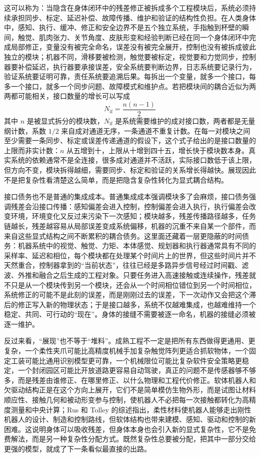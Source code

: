 这可以称为：当隐含在身体闭环中的残差修正被拆成多个工程模块后，系统必须持续承担同步、标定、延迟补偿、故障传播、维护和验证的结构性负担。在人类身体中，感知、执行、缓冲、修正和安全边界不是五个独立系统，手指触到杯壁的瞬间，触觉、肌肉张力、关节角度、皮肤形变和经验判断已经在同一个身体闭环中完成局部修正，变量没有被完全命名，误差没有被完全展开，控制也没有被拆成彼此独立的模块；机器不同，滑移要被检测，触觉要被标定，视觉要和力觉同步，控制器要补偿延迟，执行器要承接误差，安全系统要判断边界，日志系统要记录行为，验证系统要证明可靠，责任系统要追溯后果。每拆出一个变量，就多一个接口，每多一个接口，就多一个同步问题、故障模式和维护点。若把模块间的耦合近似为两两都可能相关，接口数量的增长可以写成
\begin{equation}
N_{\text{if}}=\frac{n(n-1)}{2}
\end{equation}
其中 $n$ 是被显式拆分的模块数，$N_{\text{if}}$ 是系统需要维护的成对接口数，两者都是无量纲计数，系数 $1/2$ 来自成对通道无序，一条通道不重复计数。在每一对模块之间至少需要一条同步、标定或误差传递通道的假设下，这个式子给出的是接口数量的上限而非实计数：$n$ 从五增到十，上限从十增到四十五，增长快于模块数本身。真实系统的依赖通常不是全连接，很多成对通道并不活跃，实际接口数低于该上限，但方向不变，模块拆得越细，需要同步、标定和验证的关系增长得越快。展现因此不是把复杂性看清楚这么简单，而是把隐含复杂性转化为显式耦合结构。

接口债务也不是普通的集成成本。普通集成成本强调模块多了会麻烦，接口债务强调残差会沿接口传播：感知偏差会进入控制，控制偏差会进入执行，执行偏差会改变环境，环境变化又反过来污染下一次感知；模块越多，残差传播路径越多，任务链越长，残差越容易从局部误差变成系统偏移，机器的沉重不来自某一个部件，而来自这些显式结构之间不断累积的耦合债务。这里面还藏着一层更隐蔽的时间债务：机器系统中的视觉、触觉、力矩、本体感觉、规划器和执行器通常具有不同的采样率、延迟和相位，每个模块都在处理某个时间片上的世界，但这些时间片并不天然重合，控制器拿到的“当前状态”，往往已经是多路异步信号经过时间戳、滤波、外推和融合之后生成的工程对象。只要任务进入高速接触或连续操作，残差就不只是从一个模块传到另一个模块，还会从一个时间相位错位到另一个时间相位，系统修正的可能不是此刻的误差，而是刚刚过去的误差，下一次动作又会把这个滞后的修正写入新的物理状态；于是接口越多，系统不仅越难集成，也越难维持一个稳定、共同、可行动的“现在”。身体的接缝不需要被逐一命名，机器的接缝必须被逐一维护。

反过来看，“展现”也不等于“堆料”。成熟工程不一定是把所有东西做得更通用、更复杂，一个柔性夹爪可能比高精度机械手加复杂触觉阵列更适合抓软物体，一个固定工装可能比通用识别模型更可靠，一个机械限位可能比复杂软件安全策略更稳定，一个封闭园区可能比开放道路更容易自动驾驶，真正的问题不是传感器够不够多，而是残差由谁修正、在哪里修正、以什么物理和工程代价修正。软体机器人和欠驱动结构正是在这个方向上展开，它们不是简单模仿生物外形，而是试图让材料顺应性、接触几何和被动形变参与控制，使机器人不必把每一次接触都转化为高精度测量和中央计算；Rus 和 Tolley 的综述指出，柔性材料使机器人能够走出刚性机器人的设计、制造和控制路线，但软体结构也带来建模、感知、驱动和控制的新困难\cite{rus2015}。这说明身体可以吸收残差，但身体本身也会引入新的显式复杂性，它不是免费解法，而是另一种复杂性分配方式。既然复杂性总要被分配，把其中一部分交给更强的模型，就成了下一条看似最直接的出路。

